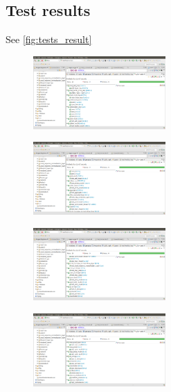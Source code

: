 \documentclass[parskip=full]{scrartcl}
\begin{document}
\pagebreak
\subsection {Test results}
See \ref{fig:tests_result} %
\begin{figure}[b]
\centering
\includegraphics[width=0.45\textwidth, center]{test1}
\end{figure}
\begin{figure}[b]
\centering
\includegraphics[width=0.45\textwidth, center]{test2}
\end{figure}
\begin{figure}[b]
\centering
\includegraphics[width=0.45\textwidth, center]{test3}
\end{figure}
\begin{figure}[b]
\centering
\includegraphics[width=0.45\textwidth, center]{test4}
\end{figure}


\pagebreak
\end{document}
